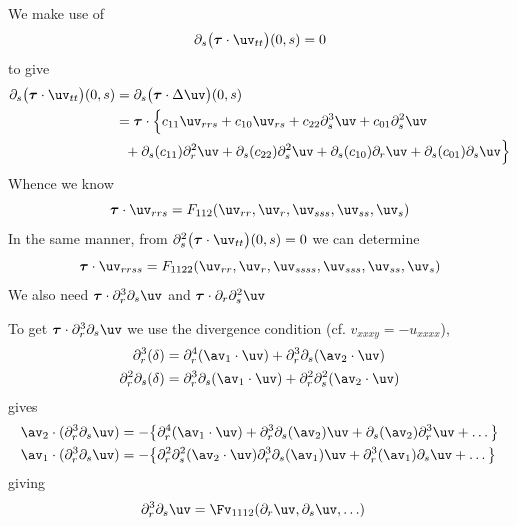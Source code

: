 \documentclass[10pt]{article}
\begin{document}
We make use of 
\[
 \partial_s\big(\tauv\cdot\uv_{tt}\big)(0,s) = 0  
\]
to give
\begin{align*}
  \partial_s\big(\tauv\cdot\uv_{tt}\big)(0,s) &= \partial_s\big(\tauv\cdot\Delta\uv\big)(0,s) \\
     &= \tauv\cdot\Big\{ c_{11} \uv_{rrs} +  c_{10} \uv_{rs}  + c_{22}\partial_s^3\uv  + c_{01} \partial_s^2\uv  \\
     &~~+  \partial_s(c_{11})\partial_r^2\uv + \partial_s(c_{22})\partial_s^2\uv  + 
         \partial_s(c_{10})\partial_r\uv + \partial_s(c_{01}) \partial_s \uv \Big\}
\end{align*}
Whence we know
\begin{equation}
  \tauv\cdot\uv_{rrs} = F_{112}( \uv_{rr}, \uv_{r}, \uv_{sss}, \uv_{ss}, \uv_s) \label{eq:rrs}
\end{equation}
In the same manner, from $\partial_s^2\big(\tauv\cdot\uv_{tt}\big)(0,s) = 0 $
we can determine
 \begin{equation}
  \tauv\cdot\uv_{rrss} = F_{1122}( \uv_{rr}, \uv_{r}, \uv_{ssss}, \uv_{sss}, \uv_{ss}, \uv_s)  \label{eq:rrss}
\end{equation}
We also need $\tauv\cdot\partial_r^3\partial_s\uv$ and $\tauv\cdot\partial_r\partial_s^2\uv$

To get $\tauv\cdot\partial_r^3\partial_s\uv$ we use the divergence condition (cf. $v_{xxxy}=-u_{xxxx}$),
\begin{align*}
  \partial_r^3(\delta) &= \partial_r^4(\av_1\cdot\uv) +\partial_r^3\partial_s(\av_2\cdot\uv) \\
   \partial_r^2\partial_s(\delta) &= \partial_r^3\partial_s(\av_1\cdot\uv) +\partial_r^2\partial_s^2(\av_2\cdot\uv)
\end{align*}
gives
\begin{align*}
\av_2\cdot(\partial_r^3\partial_s\uv) &= -\big\{ \partial_r^4(\av_1\cdot\uv) +\partial_r^3\partial_s(\av_2)\uv
                         +\partial_s(\av_2)\partial_r^3\uv + \ldots \big\} \\
\av_1\cdot(\partial_r^3\partial_s\uv) &= -\big\{ \partial_r^2\partial_s^2(\av_2\cdot\uv)
               \partial_r^3\partial_s(\av_1)\uv + \partial_r^3 (\av_1)\partial_s\uv + \ldots    \big\}
\end{align*}
giving
\begin{align*}
\partial_r^3\partial_s\uv &= \Fv_{1112}(\partial_r\uv,\partial_s\uv, \ldots)
\end{align*}
\end{document}

